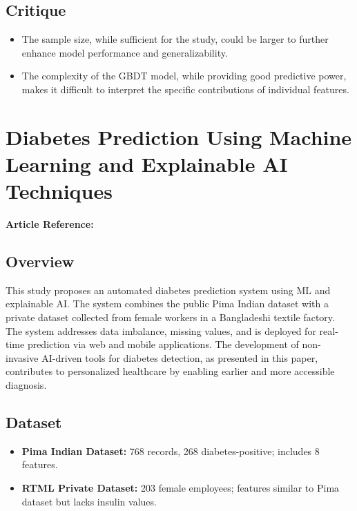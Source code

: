 \subsection*{Critique}
\begin{itemize}
    \item The sample size, while sufficient for the study, could be larger to further enhance model performance and generalizability. 
    \item The complexity of the GBDT model, while providing good predictive power, makes it difficult to interpret the specific contributions of individual features.
    
\end{itemize}

\section{Diabetes Prediction Using Machine Learning and Explainable AI Techniques}
\textbf{Article Reference:} \cite{article_2}

\subsection*{Overview}
This study proposes an automated diabetes prediction system using ML and explainable AI. The system combines the public Pima Indian dataset with a private dataset collected from female workers in a Bangladeshi textile factory. The system addresses data imbalance, missing values, and is deployed for real-time prediction via web and mobile applications. The development of non-invasive AI-driven tools for diabetes detection, as presented in this paper, contributes to personalized healthcare by enabling earlier and more accessible diagnosis.

\subsection*{Dataset}
\begin{itemize}
    \item \textbf{Pima Indian Dataset:} 768 records, 268 diabetes-positive; includes 8 features.
    \item \textbf{RTML Private Dataset:} 203 female employees; features similar to Pima dataset but lacks insulin values.
\end{itemize}

